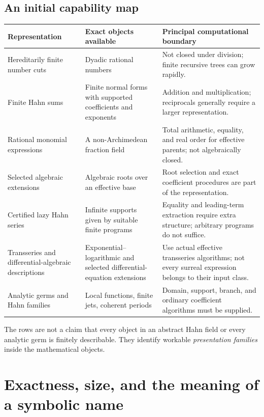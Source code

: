 \documentclass[11pt,letterpaper]{article}
\theoremstyle{definition}\newtheorem{definition}[theorem]{Definition}
\theoremstyle{remark}\newtheorem{remark}[theorem]{Remark}
\numberwithin{equation}{section}\setcounter{tocdepth}{2}
\begin{document}
\subsection{An initial capability map}
\begin{center}\small
\begin{longtable}{@{}L{0.22\textwidth}L{0.34\textwidth}L{0.35\textwidth}@{}}
\toprule Representation & Exact objects available & Principal computational boundary\\\midrule\endhead
Hereditarily finite number cuts & Dyadic rational numbers & Not closed under division; finite recursive trees can grow rapidly.\\[0.4em]
Finite Hahn sums & Finite normal forms with supported coefficients and exponents & Addition and multiplication; reciprocals generally require a larger representation.\\[0.4em]
Rational monomial expressions & A non-Archimedean fraction field & Total arithmetic, equality, and real order for effective parents; not algebraically closed.\\[0.4em]
Selected algebraic extensions & Algebraic roots over an effective base & Root selection and exact coefficient procedures are part of the representation.\\[0.4em]
Certified lazy Hahn series & Infinite supports given by suitable finite programs & Equality and leading-term extraction require extra structure; arbitrary programs do not suffice.\\[0.4em]
Transseries and differential-algebraic descriptions & Exponential--logarithmic and selected differential-equation extensions & Use actual effective transseries algorithms; not every surreal expression belongs to their input class.\\[0.4em]
Analytic germs and Hahn families & Local functions, finite jets, coherent periods & Domain, support, branch, and ordinary coefficient algorithms must be supplied.\\
\bottomrule
\end{longtable}\end{center}
The rows are not a claim that every object in an abstract Hahn field or every analytic germ is finitely describable. They identify workable \emph{presentation families} inside the mathematical objects.

\section{Exactness, size, and the meaning of a symbolic name}\label{sec:exactness}
\end{document}
